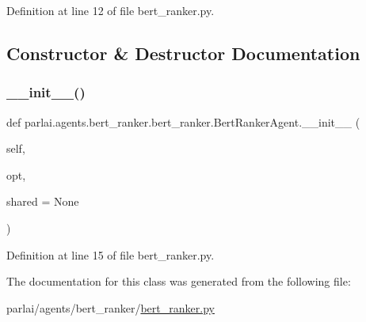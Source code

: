 Definition at line 12 of file bert\+\_\+ranker.\+py.



\subsection{Constructor \& Destructor Documentation}
\mbox{\label{classparlai_1_1agents_1_1bert__ranker_1_1bert__ranker_1_1BertRankerAgent_a1df3920ae23af044ca5abab9b0c46b10}} 
\subsubsection{\texorpdfstring{\+\_\+\+\_\+init\+\_\+\+\_\+()}{\_\_init\_\_()}}
{\footnotesize\ttfamily def parlai.\+agents.\+bert\+\_\+ranker.\+bert\+\_\+ranker.\+Bert\+Ranker\+Agent.\+\_\+\+\_\+init\+\_\+\+\_\+ (\begin{DoxyParamCaption}\item[{}]{self,  }\item[{}]{opt,  }\item[{}]{shared = {\ttfamily None} }\end{DoxyParamCaption})}



Definition at line 15 of file bert\+\_\+ranker.\+py.



The documentation for this class was generated from the following file\+:\begin{DoxyCompactItemize}
\item 
parlai/agents/bert\+\_\+ranker/\hyperlink{bert__ranker_8py}{bert\+\_\+ranker.\+py}\end{DoxyCompactItemize}
